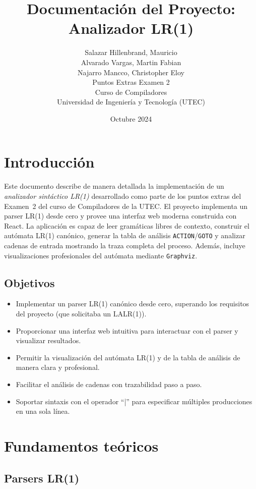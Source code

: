 \documentclass[12pt,a4paper]{article}
\title{Documentación del Proyecto: Analizador LR(1)}
\author{
Salazar Hillenbrand, Mauricio \\
Alvarado Vargas, Martin Fabian \\
Najarro Mancco, Christopher Eloy \\[1em]
Puntos Extras Examen 2 \\
Curso de Compiladores \\
Universidad de Ingeniería y Tecnología (UTEC)
}
\date{Octubre 2024}
\begin{document}
\maketitle
\tableofcontents
\newpage

\section{Introducción}

Este documento describe de manera detallada la implementación de un \emph{analizador sintáctico LR(1)} desarrollado como parte de los puntos extras del Examen~2 del curso de Compiladores de la UTEC.  El proyecto implementa un parser LR(1) desde cero y provee una interfaz web moderna construida con React.  La aplicación es capaz de leer gramáticas libres de contexto, construir el autómata LR(1) canónico, generar la tabla de análisis \texttt{ACTION}/\texttt{GOTO} y analizar cadenas de entrada mostrando la traza completa del proceso.  Además, incluye visualizaciones profesionales del autómata mediante \texttt{Graphviz}.

\subsection{Objetivos}
\begin{itemize}
  \item Implementar un parser LR(1) canónico desde cero, superando los requisitos del proyecto (que solicitaba un LALR(1)).
  \item Proporcionar una interfaz web intuitiva para interactuar con el parser y visualizar resultados.
  \item Permitir la visualización del autómata LR(1) y de la tabla de análisis de manera clara y profesional.
  \item Facilitar el análisis de cadenas con trazabilidad paso a paso.
  \item Soportar sintaxis con el operador ``|'' para especificar múltiples producciones en una sola línea.
\end{itemize}

\section{Fundamentos teóricos}

\subsection{Parsers LR(1)}
\end{document}
